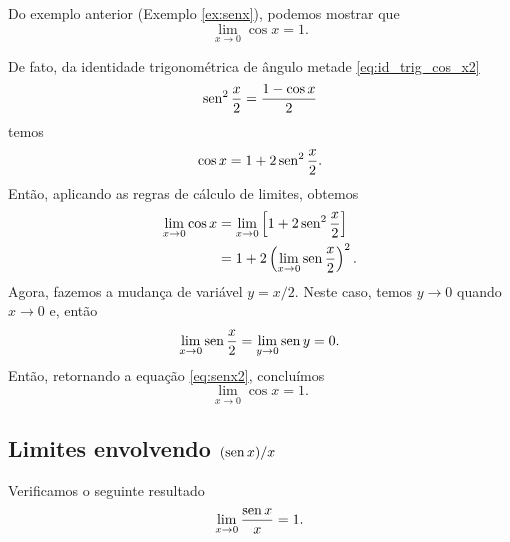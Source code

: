 \begin{obs}
  Do exemplo anterior (Exemplo \ref{ex:senx}), podemos mostrar que
\begin{equation}
  \lim_{x\to 0} \cos x = 1.
\end{equation}

De fato, da identidade trigonométrica de ângulo metade \eqref{eq:id_trig_cos_x2}
\begin{equation}
  \operatorname{sen}^2 \frac{x}{2} = \frac{1 - \cos x}{2}
\end{equation}
temos
\begin{equation}
  \cos x = 1 + 2\operatorname{sen}^2 \frac{x}{2}.
\end{equation}
Então, aplicando as regras de cálculo de limites, obtemos
\begin{align}
  \lim_{x\to 0} \cos x &= \lim_{x\to 0} \left[1 + 2\operatorname{sen}^2 \frac{x}{2}\right] \\
                       &= 1 + 2\left(\lim_{x\to 0} \operatorname{sen} \frac{x}{2}\right)^2.\label{eq:senx2}
\end{align}
Agora, fazemos a mudança de variável $y = x/2$. Neste caso, temos $y\to 0$ quando $x\to 0$ e, então
\begin{equation}
  \lim_{x\to 0} \operatorname{sen} \frac{x}{2} = \lim_{y\to 0} \operatorname{sen} y = 0.
\end{equation}
Então, retornando a equação \eqref{eq:senx2}, concluímos
\begin{equation}
  \lim_{x\to 0} \cos x = 1.
\end{equation}
\end{obs}

\subsection{Limites envolvendo $(\operatorname{sen} x)/x$}

Verificamos o seguinte resultado
\begin{equation}
  \lim_{x\to 0} \frac{\operatorname{sen} x}{x} = 1.
\end{equation}

